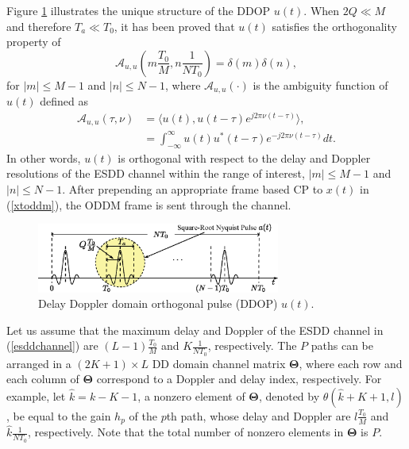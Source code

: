 \documentclass[journal]{IEEEtran}
\begin{document}
Figure \ref{shape_ut} illustrates the unique structure of the DDOP $u(t)$.
When $2Q\ll M$ and therefore $T_a\ll T_0$, it has been proved that $u(t)$ satisfies the orthogonality property of
\begin{equation}
  \mathcal A_{u,u}\left(m\frac{T_0}{M}, n\frac{1}{NT_0}\right)= \delta(m)\delta(n),\label{orth}
\end{equation}
for $|m|\le M-1$ and $|n| \le N-1$, where $\mathcal A_{u,u}(\cdot)$ is the ambiguity function of $u(t)$ defined as
\begin{align}
  \mathcal A_{u,u}(\tau,\nu) & =   \langle u(t), u(t-\tau)e^{j2\pi \nu (t-\tau)} \rangle,                          \\
                             & =  \int_{-\infty}^{\infty} u(t) u^{*} (t-\tau)e^{-j2\pi \nu (t-\tau)} dt. \nonumber
\end{align}
{In other words, $u(t)$ is orthogonal with respect to the {delay and Doppler resolutions of the ESDD channel within the range of interest, $|m|\leq M-1$ and $|n|\leq N-1$}. After prepending an appropriate frame based CP to $x(t)$ in (\ref{xtoddm}), the ODDM frame is sent through the channel.}


\begin{figure}
  \centering
  \includegraphics[width=8cm]{ut_new}
  \caption{Delay Doppler domain orthogonal pulse (DDOP) $u(t)$.}
  \label{shape_ut}
\end{figure}

Let us assume that the maximum delay and Doppler of the ESDD channel in (\ref{esddchannel}) are  $(L-1)\frac{T_0}{M}$ and $K\frac{1}{NT_0}$, respectively.
The $P$ paths can be arranged in a $(2K+1)\times L$ DD domain channel matrix $\mathbf \Theta$, where each row and each column of $\mathbf \Theta$ correspond to a Doppler and delay index, respectively. For example, let $\hat k=k-K-1$, a nonzero element of $\mathbf \Theta$, denoted by $\theta(\hat k+K+1,l)$, be equal to the gain $h_p$ of the $p$th path, whose delay and Doppler are $l\frac{T_0}{M}$ and $\hat k \frac{1}{NT_0}$, respectively. Note that the total number of nonzero elements in $\mathbf \Theta$ is $P$.
\end{document}
